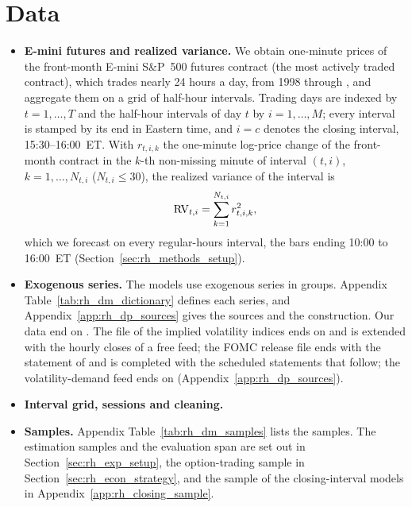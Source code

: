 

\section{Data}
\label{sec:rh_data}
\begin{itemize}
\item \textbf{E-mini futures and realized variance.} We obtain one-minute prices of the front-month E-mini S\&P~500
  futures contract (the most actively traded contract), which trades nearly 24 hours a day, from 1998 through
  \rhdsSampleEnd, and aggregate them on a grid of half-hour intervals. Trading days are indexed by $t = 1, \dots, T$
  and the half-hour intervals of day $t$ by $i = 1, \dots, M$; every interval is stamped by its end in Eastern time,
  and $i = c$ denotes the closing interval, 15:30--16:00~ET. With $r_{t,i,k}$ the one-minute log-price change of the
  front-month contract in the $k$-th non-missing minute of interval $(t,i)$, $k = 1, \dots, N_{t,i}$
  ($N_{t,i} \le 30$), the realized variance of the interval is \citep{AndersenBollerslevDieboldLabys2003}
  \[
    \mathrm{RV}_{t,i} = \sum_{k=1}^{N_{t,i}} r_{t,i,k}^2 ,
  \]
  which we forecast on every regular-hours interval, the bars ending 10:00 to 16:00~ET
  (Section~\ref{sec:rh_methods_setup}).
\item \textbf{Exogenous series.} The models use \rhdmNSeriesPooled{} exogenous series in \bkNBuckets{} groups.
  Appendix Table~\ref{tab:rh_dm_dictionary} defines each series, and Appendix~\ref{app:rh_dp_sources} gives the
  sources and the construction.
  Our data end on \rhdsSampleEnd. The file of the implied volatility indices ends on \rhdsVixVendorLast{} and is
  extended with the hourly closes of a free feed; the FOMC release file ends with the statement of \rhdsFomcFileLast{}
  and is completed with the \rhdsFomcAdded{} scheduled statements that follow; the volatility-demand feed ends on
  \rhdsVdLast{} (Appendix~\ref{app:rh_dp_sources}).
\item \textbf{Interval grid, sessions and cleaning.}
\item \textbf{Samples.} Appendix Table~\ref{tab:rh_dm_samples} lists the samples. The estimation samples and the
  evaluation span are set out in Section~\ref{sec:rh_exp_setup}, the option-trading sample in
  Section~\ref{sec:rh_econ_strategy}, and the sample of the closing-interval models in
  Appendix~\ref{app:rh_closing_sample}.
\end{itemize}

